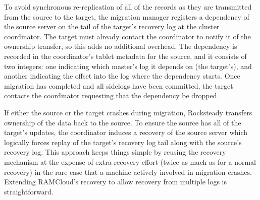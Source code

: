 To avoid synchronous re-replication of all of the records as they are
transmitted from the source to the target, the migration manager
registers a dependency of the source server on the tail of the target's
recovery log at the cluster coordinator. The target must already contact the
coordinator to notify it of the ownership transfer, so this adds no additional
overhead.  The dependency is recorded in the coordinator's tablet metadata for
the source, and it consists of two integers: one indicating which
master's log it depends on (the target's), and another indicating the offset
into the log where the dependency starts. Once migration has completed
and all sidelogs have been committed, the target contacts the
coordinator requesting that the dependency be dropped.

If either the source or the target crashes during migration, Rocksteady
transfers ownership of the data back to the source.  To ensure the source has
all of the target's updates, the coordinator induces a recovery of the source
server which logically forces replay of the target's recovery log tail along
with the source's recovery log. This approach keeps things simple by reusing
the recovery mechanism at the expense of extra recovery effort (twice as much
as for a normal recovery) in the rare case that a machine actively involved in
migration crashes.
%
Extending RAMCloud's recovery to allow recovery from multiple logs is
straightforward.
